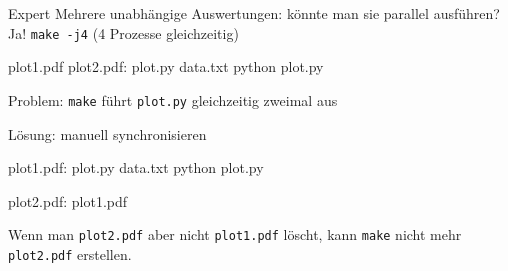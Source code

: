 \begin{frame}[fragile]{Expert}
  Mehrere unabhängige Auswertungen: könnte man sie parallel ausführen? \\
  Ja! \texttt{make -j4} (4 Prozesse gleichzeitig)

  \begin{center}
    \begin{lstmake}
      plot1.pdf plot2.pdf: plot.py data.txt
          python plot.py
    \end{lstmake}
  \end{center}

  Problem: \texttt{make} führt \texttt{plot.py} gleichzeitig zweimal aus

  Lösung: manuell synchronisieren

  \begin{center}
    \begin{lstmake}
      plot1.pdf: plot.py data.txt
          python plot.py

      plot2.pdf: plot1.pdf
    \end{lstmake}
  \end{center}

  Wenn man \texttt{plot2.pdf} aber nicht \texttt{plot1.pdf} löscht, kann \texttt{make} nicht mehr \texttt{plot2.pdf} erstellen.
\end{frame}

